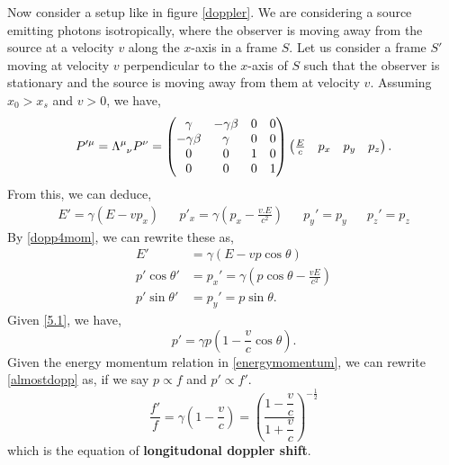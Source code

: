 \documentclass{book}
\begin{document}
Now consider a setup like in figure \ref{doppler}. We are considering a source emitting photons isotropically, where the observer is moving away from the source at a velocity $v$ along the $x$-axis in a frame $S$. Let us consider a frame $S'$ moving at velocity $v$ perpendicular to the $x$-axis of $S$ such that the observer is stationary and the source is moving away from them at velocity $v$. Assuming $x_0 > x_s$ and $v>0$, we have,
\begin{equation}
	P'^{\mu} = \Lambda\indices{^\mu_\nu}P^{\nu} = \begin{pmatrix}
		\gamma & -\gamma\beta & 0 & 0 \\
		-\gamma\beta & \gamma & 0 & 0 \\
		0 & 0 & 1 & 0 \\
		0 & 0 & 0 & 1
	\end{pmatrix}\begin{pmatrix}
	\frac{E}{c} & p_x & p_y & p_z
	\end{pmatrix}.
\end{equation}
From this, we can deduce,
\begin{align}
	E' = \gamma\left(E - vp_x\right) && p'_x = \gamma\left(p_x - \frac{v.E}{c^2}\right) && p_y' =p_y && p_z' = p_z
\end{align}
By \eqref{dopp4mom}, we can rewrite these as,
\begin{align}
	E' & = \gamma\left(E - vp\cos\theta\right) \label{5.1}\\
	p'\cos\theta' & = p_x' = \gamma(p\cos\theta - \frac{vE}{c^2}) \\
	p'\sin\theta' & = p_y' = p\sin\theta.
\end{align}
Given \eqref{5.1}, we have,
\begin{equation}
	p' = \gamma p (1-\frac{v}{c}\cos\theta). \label{almostdopp}
\end{equation}
Given the energy momentum relation in \eqref{energymomentum}, we can rewrite \eqref{almostdopp} as, if we say $p \propto f$ and $p' \propto f'$.
\begin{equation}
	\frac{f'}{f} = \gamma\left(1 - \frac{v}{c}\right) = \left(\frac{1 - \dfrac{v}{c}}{1 + \dfrac{v}{c}}\right)^{-\frac{1}{2}}
\end{equation}
which is the equation of \textbf{longitudonal doppler shift}.
\end{document}
